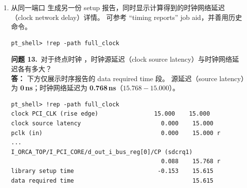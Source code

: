 \begin{enumerate}
\begin{questionBox}
\textbf{问题 10.}\ 对于起点时钟 ，时钟延迟（clock latency）必须包含在何处？\\[0.35em]
\textbf{答：} 时钟网络延迟为零，因此表示外部时钟延迟的唯一位置是 input delay 约束中的输入外部延迟（input external delay）。
正确建模方式是：对  使用  与 。

\textbf{问题 11.}\ 描述端口  的方向（即它是 input、output 还是 inout 端口）。\\[0.35em]
\textbf{答：} 端口  是 \textbf{inout} 端口，因此它既是时序路径起点，也是时序路径终点。
\begin{lstlisting}
Point                                    Incr      Path
clock PCI_CLK (rise edge)                0.000     0.000
clock network delay (propagated)         0.000     0.000
input external delay                       8.000     8.000 r
pad[0] (inout)                             0.000     8.000 r
\end{lstlisting}

\textbf{问题 12.}\ 描述该时序路径的终点（即它是 output 端口还是内部触发器）。\\[0.35em]
\textbf{答：} 终点是由  时钟的上升沿触发 flip-flop
（实际上是一个具有 setup/hold 时序检查的时序模型，外观类似 flip-flop）。
\end{questionBox}

  \item 从同一端口  生成另一份 setup 报告，同时显示计算得到的时钟网络延迟（clock network delay）详情。
        可参考 ``timing reports'' job aid，并善用历史命令。
\begin{lstlisting}
pt_shell> !rep -path full_clock
\end{lstlisting}

\begin{questionBox}
\textbf{问题 13.}\ 对于终点时钟 ，时钟源延迟（clock source latency）与时钟网络延迟各有多大？\\[0.35em]
\textbf{答：} 下方仅展示时序报告的 data required time 段。
源延迟（source latency）为 \textbf{0\,ns}；时钟网络延迟为 \textbf{0.768\,ns}（$15.768 - 15.000$）。
\begin{lstlisting}
pt_shell> !rep -path full_clock
clock PCI_CLK (rise edge)                15.000    15.000
clock source latency                       0.000    15.000
pclk (in)                                  0.000    15.000 r
...
I_ORCA_TOP/I_PCI_CORE/d_out_i_bus_reg[0]/CP (sdcrq1)
                                           0.088    15.768 r
library setup time                        -0.153    15.615
data required time                                  15.615
\end{lstlisting}


\end{questionBox}
\end{enumerate}
